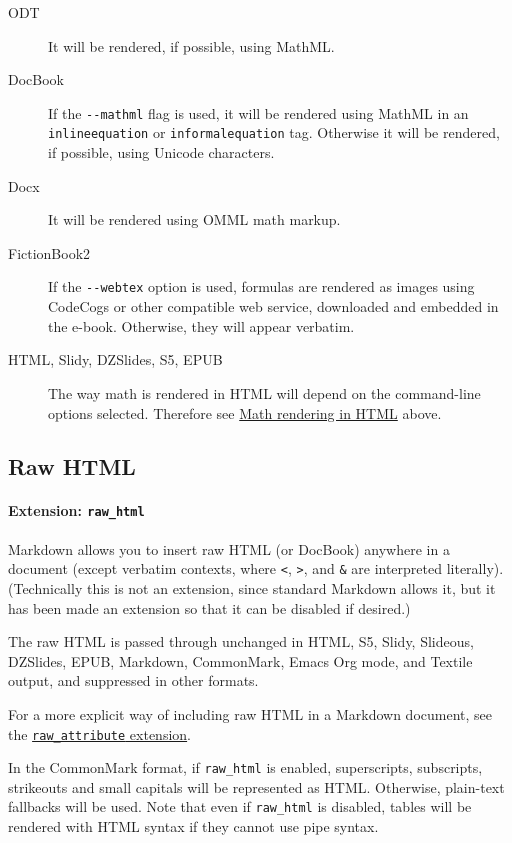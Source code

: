 \documentclass[
  12pt,
  a4paper,
]{article}
\let\oldparagraph\paragraph
\renewcommand{\paragraph}[1]{\oldparagraph{#1}\mbox{}}
\begin{document}
\begin{description}
\item[ODT]
It will be rendered, if possible, using MathML.
\item[DocBook]
If the \texttt{-\/-mathml} flag is used, it will be rendered using MathML in an
\texttt{inlineequation} or \texttt{informalequation} tag. Otherwise it will be rendered, if
possible, using Unicode characters.
\item[Docx]
It will be rendered using OMML math markup.
\item[FictionBook2]
If the \texttt{-\/-webtex} option is used, formulas are rendered as images using CodeCogs or other
compatible web service, downloaded and embedded in the e-book. Otherwise, they will appear
verbatim.
\item[HTML, Slidy, DZSlides, S5, EPUB]
The way math is rendered in HTML will depend on the command-line options selected. Therefore see
\protect\hyperlink{math-rendering-in-html}{Math rendering in HTML} above.
\end{description}

\hypertarget{raw-html}{%
\subsection{Raw HTML}\label{raw-html}}

\hypertarget{extension-raw_html}{%
\paragraph{\texorpdfstring{Extension:
\texttt{raw\_html}}{Extension: raw\_html}}\label{extension-raw_html}}

Markdown allows you to insert raw HTML (or DocBook) anywhere in a document (except verbatim
contexts, where \texttt{\textless{}}, \texttt{\textgreater{}}, and \texttt{\&} are interpreted
literally). (Technically this is not an extension, since standard Markdown allows it, but it has
been made an extension so that it can be disabled if desired.)

The raw HTML is passed through unchanged in HTML, S5, Slidy, Slideous, DZSlides, EPUB, Markdown,
CommonMark, Emacs Org mode, and Textile output, and suppressed in other formats.

For a more explicit way of including raw HTML in a Markdown document, see the
\protect\hyperlink{extension-raw_attribute}{\texttt{raw\_attribute} extension}.

In the CommonMark format, if \texttt{raw\_html} is enabled, superscripts, subscripts, strikeouts
and small capitals will be represented as HTML. Otherwise, plain-text fallbacks will be used. Note
that even if \texttt{raw\_html} is disabled, tables will be rendered with HTML syntax if they
cannot use pipe syntax.
\end{document}
